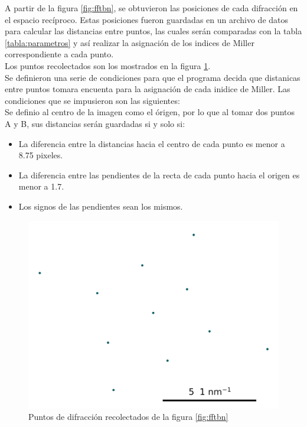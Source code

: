 \documentclass[reprint,amsmath,amssymb,aps,]{revtex4-2}
\begin{document}
A partir de la figura \ref{fig:fftbn}, se obtuvieron las posiciones de cada difracción en el espacio recíproco. Estas posiciones fueron guardadas en un archivo de datos para 
calcular las distancias entre puntos, las cuales serán comparadas con la tabla \ref{tabla:parametros} y así realizar la asignación de los indices de Miller correspondiente a cada punto.\\
 Los puntos recolectados son los mostrados en la figura \ref{fig:puntosiniciales}.\\
 Se definieron una serie de condiciones para que el programa decida que distanicas entre puntos tomara encuenta para la asignación de cada inidice de Miller.
 Las condiciones que se impusieron son las 
siguientes:\\
Se definio al centro de la imagen como el órigen, por lo que al tomar dos puntos A y B, sus distancias serán guardadas si y solo si:
\begin{itemize}
   \item La diferencia entre la distancias hacia el centro de cada punto es menor a 8.75 pixeles.
   \item La diferencia entre las pendientes de la recta de cada punto hacia el origen es menor a 1.7.\\
   \item Los signos de las pendientes sean los mismos. 
\end{itemize}
 \begin{figure}[H]
     \centering
     \includegraphics[scale=0.4]{../Graphics/inicial.png}
     \caption{Puntos de difracción recolectados de la figura \ref{fig:fftbn}}
     \label{fig:puntosiniciales}
 \end{figure}
\end{document}
